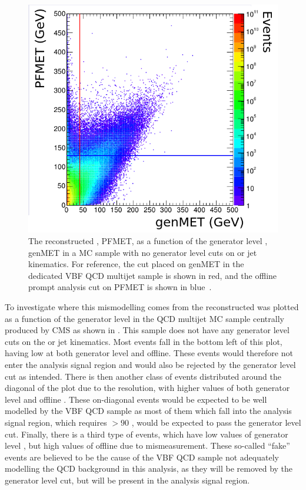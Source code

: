 \begin{figure}
  \includegraphics[width=.7\largefigwidth]{plots/parked/AN-14-243-figs/Joao_140209_p11.png}
  \caption{The reconstructed \MET, PFMET, as a function of the generator level \MET, genMET in a \ac{MC} sample with no generator level cuts on \MET or jet kinematics. For reference, the cut placed on genMET in the dedicated \ac{VBF} \ac{QCD} multijet sample is shown in red, and the offline prompt analysis cut on PFMET is shown in blue~\cite{ARTICLE:CMSAN-14-243}.}
  \label{fig:parkedmcqcd}
\end{figure}

To investigate where this mismodelling comes from the reconstructed \MET was plotted as a function of the generator level \MET in the \ac{QCD} multijet \ac{MC} sample centrally produced by CMS as shown in . This sample does not have any generator level cuts on the \MET or jet kinematics. Most events fall in the bottom left of this plot, having low \MET at both generator level and offline. These events would therefore not enter the analysis signal region and would also be rejected by the generator level cut as intended. There is then another class of events distributed around the diagonal of the plot due to the \MET resolution, with higher values of both generator level and offline \MET. These on-diagonal events would be expected to be well modelled by the \ac{VBF} \ac{QCD} sample as most of them which fall into the analysis signal region, which requires \MET$>90$ \GeV, would be expected to pass the generator level cut. Finally, there is a third type of events, which have low values of generator level \MET, but high values of offline \MET due to mismeasurement. These so-called ``fake'' \MET events are believed to be the cause of the \ac{VBF} \ac{QCD} sample not adequately modelling the \ac{QCD} background in this analysis, as they will be removed by the generator level cut, but will be present in the analysis signal region. 

